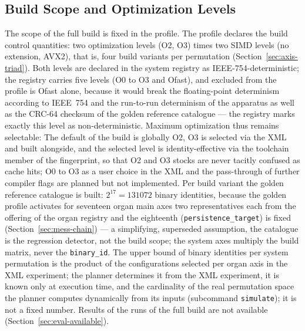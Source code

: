 \begin{nurlang}
\subsection{Build Scope and Optimization Levels}\label{sec:eval-build-scope}
The scope of the full build is fixed in the profile. The profile declares the build control
quantities: two optimization levels (O2, O3) times two SIMD levels (no extension, AVX2), that is,
four build variants per permutation (Section~\ref{sec:axis-triad}). Both levels are declared in the
system registry as IEEE-754-deterministic; the registry carries five levels (O0 to O3 and Ofast), and
excluded from the profile is Ofast alone, because it would break the floating-point determinism
according to IEEE~754 and the run-to-run determinism of the apparatus as well as the CRC-64 checksum
of the golden reference catalogue --- the registry marks exactly this level as non-deterministic.
Maximum optimization thus remains selectable: The default of the build is globally O2, O3 is selected
via the XML and built alongside, and the selected level is identity-effective via the toolchain
member of the fingerprint, so that O2 and O3 stocks are never tacitly confused as cache hits; O0 to
O3 as a user choice in the XML and the pass-through of further compiler flags are planned but not
implemented. Per build variant the golden reference catalogue is built: $2^{17} = 131072$ binary
identities, because the golden profile activates for seventeen organ main axes two representatives
each from the offering of the organ registry and the eighteenth (\texttt{persistence\_target}) is
fixed (Section~\ref{sec:mess-chain}) --- a simplifying, superseded assumption, the catalogue is the
regression detector, not the build scope; the system axes multiply the build matrix, never the
\texttt{binary\_id}. The upper bound of binary identities per system permutation is the product of the
configurations selected per organ axis in the XML experiment; the planner determines it from the XML
experiment, it is known only at execution time, and the cardinality of the real permutation space the
planner computes dynamically from its inputs (subcommand \texttt{simulate}); it is not a fixed number. Results of the runs of the
full build are not available (Section~\ref{sec:eval-available}).
\end{nurlang}
